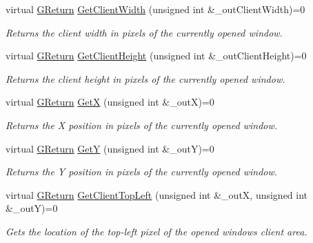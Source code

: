 \begin{DoxyCompactItemize}
virtual \mbox{\hyperlink{namespaceGW_a67a839e3df7ea8a5c5686613a7a3de21}{G\+Return}} \mbox{\hyperlink{classGW_1_1SYSTEM_1_1GWindow_a6cedaf7ca08ed3519092196a8ae79784}{Get\+Client\+Width}} (unsigned int \&\+\_\+out\+Client\+Width)=0
\begin{DoxyCompactList}\small\item\em Returns the client width in pixels of the currently opened window. \end{DoxyCompactList}\item 
virtual \mbox{\hyperlink{namespaceGW_a67a839e3df7ea8a5c5686613a7a3de21}{G\+Return}} \mbox{\hyperlink{classGW_1_1SYSTEM_1_1GWindow_aca175a29d6e87e4d4ed848325216c8f1}{Get\+Client\+Height}} (unsigned int \&\+\_\+out\+Client\+Height)=0
\begin{DoxyCompactList}\small\item\em Returns the client height in pixels of the currently opened window. \end{DoxyCompactList}\item 
virtual \mbox{\hyperlink{namespaceGW_a67a839e3df7ea8a5c5686613a7a3de21}{G\+Return}} \mbox{\hyperlink{classGW_1_1SYSTEM_1_1GWindow_a61da1f01be5fa48df2375701ed0062e9}{GetX}} (unsigned int \&\+\_\+outX)=0
\begin{DoxyCompactList}\small\item\em Returns the X position in pixels of the currently opened window. \end{DoxyCompactList}\item 
virtual \mbox{\hyperlink{namespaceGW_a67a839e3df7ea8a5c5686613a7a3de21}{G\+Return}} \mbox{\hyperlink{classGW_1_1SYSTEM_1_1GWindow_a58d456c963afd1b4d9235a1336d57754}{GetY}} (unsigned int \&\+\_\+outY)=0
\begin{DoxyCompactList}\small\item\em Returns the Y position in pixels of the currently opened window. \end{DoxyCompactList}\item 
virtual \mbox{\hyperlink{namespaceGW_a67a839e3df7ea8a5c5686613a7a3de21}{G\+Return}} \mbox{\hyperlink{classGW_1_1SYSTEM_1_1GWindow_ac80bfaba809d5eb54d6a11b11deddeb7}{Get\+Client\+Top\+Left}} (unsigned int \&\+\_\+outX, unsigned int \&\+\_\+outY)=0
\begin{DoxyCompactList}\small\item\em Gets the location of the top-\/left pixel of the opened window\textquotesingle{}s client area. \end{DoxyCompactList}\item 

\end{DoxyCompactItemize}
